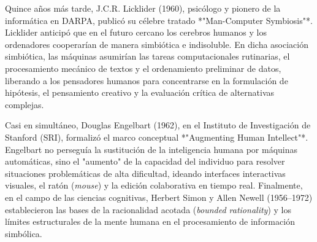 Quince años más tarde, J.C.R. Licklider (1960), psicólogo y pionero de la informática en DARPA, publicó su célebre tratado *"Man-Computer Symbiosis"*. Licklider anticipó que en el futuro cercano los cerebros humanos y los ordenadores cooperarían de manera simbiótica e indisoluble. En dicha asociación simbiótica, las máquinas asumirían las tareas computacionales rutinarias, el procesamiento mecánico de textos y el ordenamiento preliminar de datos, liberando a los pensadores humanos para concentrarse en la formulación de hipótesis, el pensamiento creativo y la evaluación crítica de alternativas complejas. 

Casi en simultáneo, Douglas Engelbart (1962), en el Instituto de Investigación de Stanford (SRI), formalizó el marco conceptual *"Augmenting Human Intellect"*. Engelbart no perseguía la sustitución de la inteligencia humana por máquinas automáticas, sino el "aumento" de la capacidad del individuo para resolver situaciones problemáticas de alta dificultad, ideando interfaces interactivas visuales, el ratón (\textit{mouse}) y la edición colaborativa en tiempo real. Finalmente, en el campo de las ciencias cognitivas, Herbert Simon y Allen Newell (1956--1972) establecieron las bases de la racionalidad acotada (\textit{bounded rationality}) y los límites estructurales de la mente humana en el procesamiento de información simbólica.\par\vspace{0.4cm}

